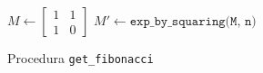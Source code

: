 \begin{algorithm}[h]
	\DontPrintSemicolon
	
	

	$M \leftarrow \begin{bmatrix}1 & 1\\1 & 0\end{bmatrix}$\;
	$M' \leftarrow \texttt{exp\_by\_squaring(M, n)}$\;

	
	\;

	\caption{Procedura \texttt{get\_fibonacci}}
	\label{get_fibonacci}
\end{algorithm}

